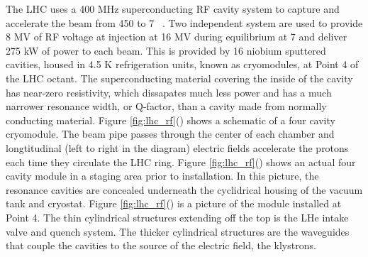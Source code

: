 \par The LHC uses a 400 MHz superconducting RF cavity system to
capture and accelerate the beam from 450 \GeV to 7
\TeV~\cite{lhc:machine_description}.  Two independent system are used
to provide 8 MV of RF voltage at injection at 16 MV during equilibrium
at 7 \TeV and deliver 275 kW of power to each beam.  This is provided
by 16 niobium sputtered cavities, housed in 4.5 K refrigeration units,
known as cryomodules, at Point 4 of the LHC octant.  The
superconducting material covering the inside of the cavity has
near-zero resistivity, which dissapates much less power and has a much
narrower resonance width, or Q-factor, than a cavity made from
normally conducting material. Figure
\ref{fig:lhc_rf}() shows a schematic of a four
cavity cryomodule.  The beam pipe passes through the center of each
chamber and longtitudinal (left to right in the diagram) electric
fields accelerate the protons each time they circulate the LHC
ring. Figure \ref{fig:lhc_rf}() shows an
actual four cavity module in a staging area prior to installation.  In
this picture, the resonance cavities are concealed underneath the
cyclidrical housing of the vacuum tank and cryostat.  Figure
\ref{fig:lhc_rf}() is a picture of the
module installed at Point 4.  The thin cylindrical structures
extending off the top is the LHe intake valve and quench system.  The
thicker cylindrical structures are the waveguides that couple the
cavities to the source of the electric field, the klystrons.   

